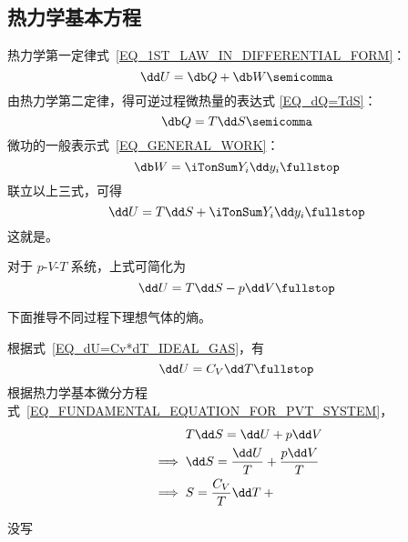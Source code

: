  \subsection{热力学基本方程}
    热力学第一定律式~\eqref{EQ_1ST_LAW_IN_DIFFERENTIAL_FORM}：
    \begin{equation}
      \dd U = \db Q + \db W \semicomma
    \end{equation}
    由热力学第二定律，得可逆过程微热量的表达式 \eqref{EQ_dQ=TdS}：
    \begin{equation}
      \db Q = T \dd S \semicomma
    \end{equation}
    微功的一般表示式~\eqref{EQ_GENERAL_WORK}：
    \begin{equation}
      \db W = \iTonSum Y_i \dd y_i \fullstop
    \end{equation}
    联立以上三式，可得
    \begin{equation} \label{EQ_FUNDAMENTAL_EQUATION_OF_THERMODYNAMICS}
      \dd U = T \dd S + \iTonSum Y_i \dd y_i \fullstop
    \end{equation}
    这就是。
    
    对于 $p\text{-}V\text{-}T$ 系统，上式可简化为
    \begin{equation} \label{EQ_FUNDAMENTAL_EQUATION_FOR_PVT_SYSTEM}
      \dd U = T \dd S - p \dd V \fullstop
    \end{equation}
    
    \begin{myExample}[理想气体的熵]
      下面推导不同过程下理想气体的熵。
      \begin{myEnum1}
          根据式~\eqref{EQ_dU=Cv*dT_IDEAL_GAS}，有
          \begin{equation}
            \dd U = C_V \dd T \fullstop
          \end{equation}
          根据热力学基本微分方程式~\eqref{EQ_FUNDAMENTAL_EQUATION_FOR_PVT_SYSTEM}，
          \begin{align}
            &\mathrel{\phantom{\implies}} T \dd S = \dd U + p \dd V \notag \\
            &\implies \dd S = \frac{\dd U}{T} + \frac{p \dd V}{T} \notag \\
            &\implies S = \frac{C_V}{T} \dd T + \frac{}{}
          \end{align}%
        
          没写%
      \end{myEnum1}
    \end{myExample}
  
